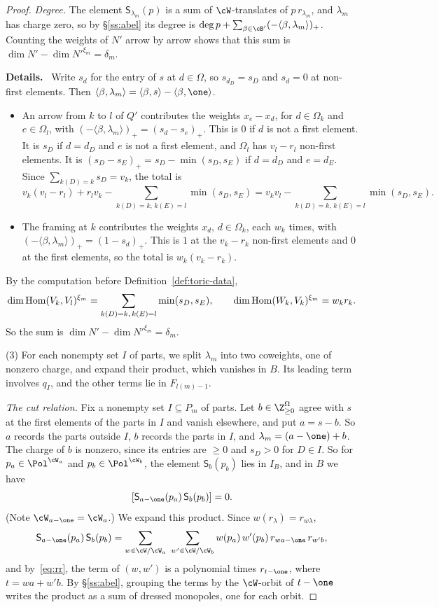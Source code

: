 \documentclass[11pt]{amsart}
\newenvironment{details}{\par\color{black!60!green}\noindent\textbf{Details.}\ }{\par}
\begin{document}
\begin{proof}
\emph{Degree.}  The element $\mathsf S_{\lambda_m}(p)$ is a sum of $\cW$-translates of
$p\,r_{\lambda_m}$, and $\lambda_m$ has charge zero, so by \S\ref{ss:abel}
its degree is $\deg p+\sum_{\beta\in\cB'}(-\langle\beta,\lambda_m\rangle)_+$.
Counting the weights of $N'$ arrow by arrow shows that this sum is
$\dim N'-\dim N'^{\xi_m}=\delta_m$.
\begin{details}
Write $s_d$ for the entry of $s$ at $d\in\Omega$, so $s_{d_D}=s_D$ and $s_d=0$
at non-first elements.  Then $\langle\beta,\lambda_m\rangle
=\langle\beta,s\rangle-\langle\beta,\one\rangle$.
\begin{itemize}[leftmargin=2em]
\item An arrow from $k$ to $l$ of $Q'$ contributes the weights $x_e-x_d$, for
$d\in\Omega_k$ and $e\in\Omega_l$, with
$(-\langle\beta,\lambda_m\rangle)_+=(s_d-s_e)_+$.  This is $0$ if $d$ is not
a first element.  It is $s_D$ if $d=d_D$ and $e$ is not a first element, and
$\Omega_l$ has $v_l-r_l$ non-first elements.  It is
$(s_D-s_E)_+=s_D-\min(s_D,s_E)$ if $d=d_D$ and $e=d_E$.  Since
$\sum_{k(D)=k}s_D=v_k$, the total is
\[
 v_k(v_l-r_l)+r_lv_k-\sum_{k(D)=k,\,k(E)=l}\min(s_D,s_E)
 =v_kv_l-\sum_{k(D)=k,\,k(E)=l}\min(s_D,s_E).
\]
\item The framing at $k$ contributes the weights $x_d$, $d\in\Omega_k$, each
$w_k$ times, with $(-\langle\beta,\lambda_m\rangle)_+=(1-s_d)_+$.  This is $1$
at the $v_k-r_k$ non-first elements and $0$ at the first elements, so the
total is $w_k(v_k-r_k)$.
\end{itemize}
By the computation before Definition~\ref{def:toric-data},
\[
 \dim\operatorname{Hom}(V_k,V_l)^{\xi_m}=\sum_{k(D)=k,\,k(E)=l}\min(s_D,s_E),\qquad
 \dim\operatorname{Hom}(W_k,V_k)^{\xi_m}=w_kr_k .
\]
So the sum is $\dim N'-\dim N'^{\xi_m}=\delta_m$.
\end{details}

(3) For each nonempty set $I$ of parts, we split $\lambda_m$ into two
coweights, one of nonzero charge, and expand their product, which vanishes in
$B$.  Its leading term involves $q_I$, and the other terms lie in
$F_{l(m)-1}$.

\emph{The cut relation.}  Fix a nonempty set $I\subseteq P_m$ of parts.  Let $b\in\Z^\Omega_{\ge0}$
agree with $s$ at the first elements of the parts in $I$ and vanish
elsewhere, and put $a=s-b$.  So $a$ records the parts outside $I$, $b$ records
the parts in $I$, and $\lambda_m=(a-\one)+b$.  The charge of $b$ is nonzero,
since its entries are $\ge0$ and $s_D>0$ for $D\in I$.  So for
$p_a\in\Pol^{\cW_a}$ and $p_b\in\Pol^{\cW_b}$, the element
$\mathsf S_b(p_b)$ lies in $I_B$, and in $B$ we have
\begin{equation}\label{eq:cutrel}
 [\mathsf S_{a-\one}(p_a)\,\mathsf S_b(p_b)]=0.
\end{equation}
(Note $\cW_{a-\one}=\cW_a$.)  We expand this product.  Since
$w(r_\lambda)=r_{w\lambda}$,
\[
 \mathsf S_{a-\one}(p_a)\,\mathsf S_b(p_b)
 =\sum_{w\in\cW/\cW_a}\ \sum_{w'\in\cW/\cW_b}w(p_a)\,w'(p_b)\,
 r_{wa-\one}\,r_{w'b},
\]
and by~\eqref{eq:rr}, the term of $(w,w')$ is a polynomial times $r_{t-\one}$,
where $t=wa+w'b$.  By \S\ref{ss:abel}, grouping the terms by the
$\cW$-orbit of $t-\one$ writes the product as a sum of dressed monopoles, one
for each orbit.


\end{proof}
\end{document}
